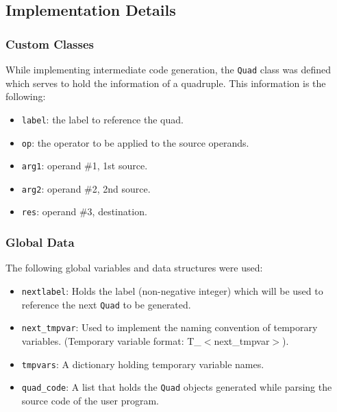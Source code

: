 \documentclass{article}
\def\code#1{\texttt{#1}} %
\begin{document}
\subsection{Implementation Details}

\subsubsection{Custom Classes}
While implementing intermediate code generation, the \code{Quad} class was defined which
serves to hold the information of a quadruple. This information is the following:
\begin{itemize}
 \item \code{label}: the label to reference the quad.
 \item \code{op}: the operator to be applied to the source operands.
 \item \code{arg1}: operand \#1, 1st source.
 \item \code{arg2}: operand \#2, 2nd source.
 \item \code{res}: operand \#3, destination.
\end{itemize}

\subsubsection{Global Data}
The following global variables and data structures were used:
\begin{itemize}
 \item \code{nextlabel}: Holds the label (non-negative integer) which will be used to reference
                         the next \code{Quad} to be generated.
 \item \code{next\_tmpvar}: Used to implement the naming convention of temporary variables.
                            (Temporary variable format: T\_$<$next\_tmpvar$>$).
 \item \code{tmpvars}: A dictionary holding temporary variable names.
 \item \code{quad\_code}: A list that holds the \code{Quad} objects generated while parsing
                          the source code of the user program.
\end{itemize}

\newpage
\end{document}
